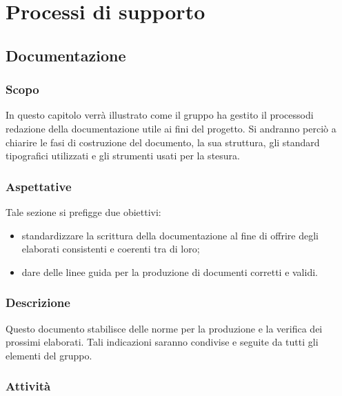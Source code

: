 \section{Processi di supporto}
    \subsection{Documentazione}
        \subsubsection{Scopo}
            In questo capitolo verrà illustrato come il gruppo ha gestito il processo\glosp di redazione della documentazione utile ai fini del progetto\glo.
            Si andranno perciò a chiarire le fasi di costruzione del documento, la sua struttura, gli standard tipografici utilizzati e gli strumenti
            usati per la stesura.
        \subsubsection{Aspettative}
            Tale sezione si prefigge due obiettivi:
            \begin{itemize}
                \item standardizzare la scrittura della documentazione al fine di offrire degli elaborati consistenti e coerenti tra di loro;
                \item dare delle linee guida per la produzione di documenti corretti e validi.
            \end{itemize}
        \subsubsection{Descrizione}
            Questo documento stabilisce delle norme per la produzione e la verifica dei prossimi elaborati. Tali indicazioni saranno condivise e seguite
            da tutti gli elementi del gruppo.
        \subsubsection{Attività}
